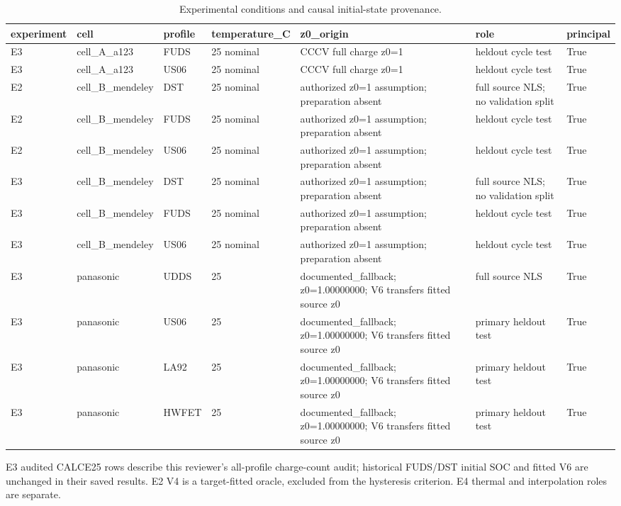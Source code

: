\begin{table}[!t]
\centering
\footnotesize
\caption{Experimental conditions and causal initial-state provenance.}
\label{tab:reviewer-conditions-3}
\setlength{\tabcolsep}{3pt}
\begin{tabular}{llll p{} p{} l}
\toprule
experiment & cell & profile & temperature\_C & z0\_origin & role & principal \\
\midrule
E3 & cell\_A\_a123 & FUDS & 25 nominal & CCCV full charge z0=1 & heldout cycle test & True \\
E3 & cell\_A\_a123 & US06 & 25 nominal & CCCV full charge z0=1 & heldout cycle test & True \\
E2 & cell\_B\_mendeley & DST & 25 nominal & authorized z0=1 assumption; preparation absent & full source NLS; no validation split & True \\
E2 & cell\_B\_mendeley & FUDS & 25 nominal & authorized z0=1 assumption; preparation absent & heldout cycle test & True \\
E2 & cell\_B\_mendeley & US06 & 25 nominal & authorized z0=1 assumption; preparation absent & heldout cycle test & True \\
E3 & cell\_B\_mendeley & DST & 25 nominal & authorized z0=1 assumption; preparation absent & full source NLS; no validation split & True \\
E3 & cell\_B\_mendeley & FUDS & 25 nominal & authorized z0=1 assumption; preparation absent & heldout cycle test & True \\
E3 & cell\_B\_mendeley & US06 & 25 nominal & authorized z0=1 assumption; preparation absent & heldout cycle test & True \\
E3 & panasonic & UDDS & 25 & documented\_fallback; z0=1.00000000; V6 transfers fitted source z0 & full source NLS & True \\
E3 & panasonic & US06 & 25 & documented\_fallback; z0=1.00000000; V6 transfers fitted source z0 & primary heldout test & True \\
E3 & panasonic & LA92 & 25 & documented\_fallback; z0=1.00000000; V6 transfers fitted source z0 & primary heldout test & True \\
E3 & panasonic & HWFET & 25 & documented\_fallback; z0=1.00000000; V6 transfers fitted source z0 & primary heldout test & True \\
\bottomrule
\end{tabular}
\par\smallskip\begin{minipage}{0.98\textwidth}\footnotesize E3 audited CALCE25 rows describe this reviewer's all-profile charge-count audit; historical FUDS/DST initial SOC and fitted V6 are unchanged in their saved results. E2 V4 is a target-fitted oracle, excluded from the hysteresis criterion. E4 thermal and interpolation roles are separate.\end{minipage}
\end{table}


